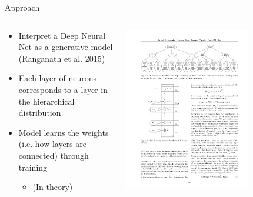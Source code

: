 \documentclass{beamer}
\begin{document}
\begin{frame}{Approach}
  \begin{columns}[T]
    \begin{column}{.5\textwidth}
  	\begin{itemize}
  	\item
  	Interpret a Deep Neural Net as a generative model (Ranganath et al. 2015)
	\item
	Each layer of neurons corresponds to a layer in the hierarchical distribution
	\item
	Model learns the weights (i.e. how layers are connected) through training	
	\begin{itemize}
		\item
		(In theory)
	\end{itemize}
	\end{itemize}
    \end{column}
    \begin{column}{.5\textwidth}
   	\includegraphics[width = 0.7\textwidth]{DEF.pdf}
    \end{column}
  \end{columns}
\end{frame}
\end{document}
